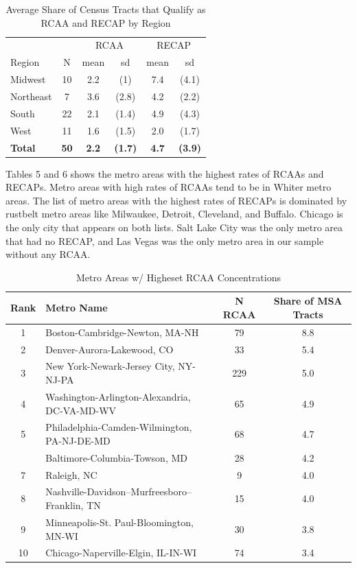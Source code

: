 \documentclass[11pt,]{article}
\begin{document}
\begin{table}[t]

\caption{\label{tab:table4}Average Share of Census Tracts that Qualify as RCAA and RECAP by Region}
\centering
\begin{tabular}{lccccc}
\toprule
\multicolumn{2}{c}{ } & \multicolumn{2}{c}{RCAA} & \multicolumn{2}{c}{RECAP} \\
\cmidrule(l{3pt}r{3pt}){3-4} \cmidrule(l{3pt}r{3pt}){5-6}
Region & N & mean & sd & mean & sd\\
\midrule
Midwest & 10 & 2.2 & (1) & 7.4 & (4.1)\\
Northeast & 7 & 3.6 & (2.8) & 4.2 & (2.2)\\
South & 22 & 2.1 & (1.4) & 4.9 & (4.3)\\
West & 11 & 1.6 & (1.5) & 2.0 & (1.7)\\
\textbf{Total} & \textbf{50} & \textbf{2.2} & \textbf{(1.7)} & \textbf{4.7} & \textbf{(3.9)}\\
\bottomrule
\end{tabular}
\end{table}

Tables 5 and 6 shows the metro areas with the highest rates of RCAAs and
RECAPs. Metro areas with high rates of RCAAs tend to be in Whiter metro
areas. The list of metro areas with the highest rates of RECAPs is
dominated by rustbelt metro areas like Milwaukee, Detroit, Cleveland,
and Buffalo. Chicago is the only city that appears on both lists. Salt
Lake City was the only metro area that had no RECAP, and Las Vegas was
the only metro area in our sample without any RCAA.

\begin{table}[t]

\caption{\label{tab:table5}Metro Areas w/ Higheset RCAA Concentrations}
\centering
\begin{tabular}{clcc}
\toprule
Rank & Metro Name & N RCAA & Share of MSA Tracts\\
\midrule
1 & Boston-Cambridge-Newton, MA-NH & 79 & 8.8\\
2 & Denver-Aurora-Lakewood, CO & 33 & 5.4\\
3 & New York-Newark-Jersey City, NY-NJ-PA & 229 & 5.0\\
4 & Washington-Arlington-Alexandria, DC-VA-MD-WV & 65 & 4.9\\
5 & Philadelphia-Camden-Wilmington, PA-NJ-DE-MD & 68 & 4.7\\
\addlinespace
6 & Baltimore-Columbia-Towson, MD & 28 & 4.2\\
7 & Raleigh, NC & 9 & 4.0\\
8 & Nashville-Davidson--Murfreesboro--Franklin, TN & 15 & 4.0\\
9 & Minneapolis-St. Paul-Bloomington, MN-WI & 30 & 3.8\\
10 & Chicago-Naperville-Elgin, IL-IN-WI & 74 & 3.4\\
\bottomrule
\end{tabular}
\end{table}
\end{document}
